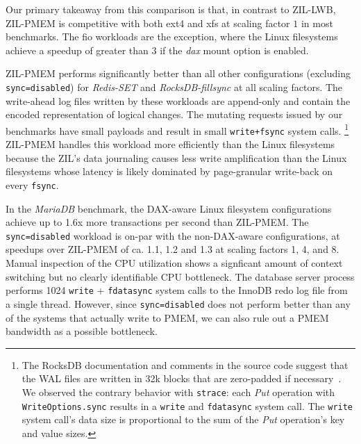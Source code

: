 \documentclass[12pt,a4paper,twoside]{book}
\begin{document}
Our primary takeaway from this comparison is that, in contrast to ZIL-LWB, ZIL-PMEM is competitive with both ext4 and xfs at scaling factor $1$ in most benchmarks.
The fio workloads are the exception, where the Linux filesystems achieve a speedup of greater than $3$ if the \textit{dax} mount option is enabled.

ZIL-PMEM performs significantly better than all other configurations (excluding \lstinline{sync=disabled}) for \textit{Redis-SET} and \textit{RocksDB-fillsync} at all scaling factors.
The write-ahead log files written by these workloads are append-only and contain the encoded representation of logical changes.
The mutating requests issued by our benchmarks have small payloads and result in small \lstinline{write+fsync} system calls.%
\footnote{
    The RocksDB documentation and comments in the source code suggest that the WAL files are written in 32k blocks that are zero-padded if necessary~\cite[db/log\_writer.h]{RocksDBGitHubWikiWalPerformance}.
    We observed the contrary behavior with \lstinline{strace}: each \textit{Put} operation with \lstinline{WriteOptions.sync} results in a \lstinline{write} and \lstinline{fdatasync} system call. The \lstinline{write} system call's data size is proportional to the sum of the \textit{Put} operation's key and value sizes.
}
ZIL-PMEM handles this workload more efficiently than the Linux filesystems because the ZIL's data journaling causes less write amplification than the Linux filesystems whose latency is likely dominated by page-granular write-back on every \lstinline{fsync}.

In the \textit{MariaDB} benchmark, the DAX-aware Linux filesystem configurations achieve up to 1.6x more transactions per second than ZIL-PMEM.
The \lstinline{sync=disabled} workload is on-par with the non-DAX-aware configurations, at speedups over ZIL-PMEM of ca. 1.1, 1.2 and 1.3 at scaling factors 1, 4, and 8.
Manual inspection of the CPU utilization shows a signficant amount of context switching but no clearly identifiable CPU bottleneck.
The database server process performs 1024 \lstinline{write} + \lstinline{fdatasync} system calls to the InnoDB redo log file from a single thread.
However, since \lstinline{sync=disabled} does not perform better than any of the systems that actually write to PMEM, we can also rule out a PMEM bandwidth as a possible bottleneck.
\end{document}
